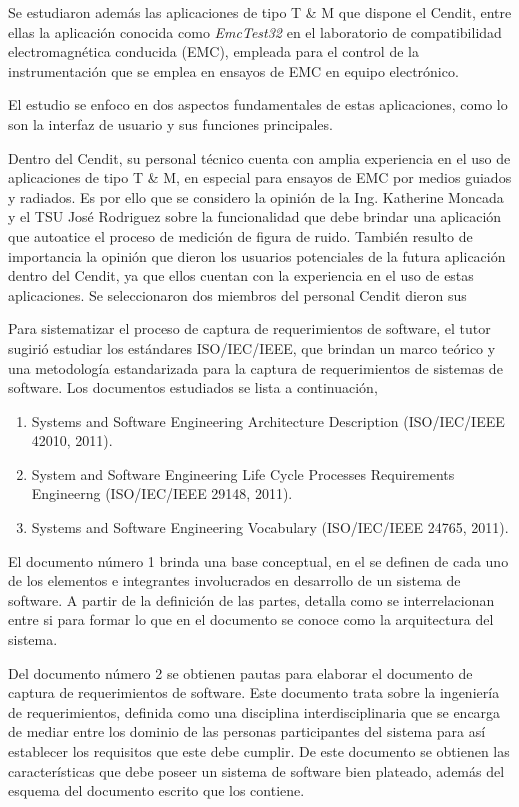 \documentclass[paper=letter,oneside,fontsize=12pt, parskip=full]{article}
\begin{document}
	Se estudiaron además las aplicaciones de tipo T \& M que dispone el Cendit, entre ellas la aplicación conocida como \emph{EmcTest32} en el laboratorio de compatibilidad electromagnética conducida (EMC), empleada para el control de la instrumentación que se emplea en ensayos de EMC en equipo electrónico.
	
	El estudio se enfoco en dos aspectos fundamentales de estas aplicaciones, como lo son la interfaz de usuario y sus funciones principales. 
	
	Dentro del Cendit, su personal técnico cuenta con amplia experiencia en el uso de aplicaciones de tipo T \& M, en especial para ensayos de EMC por medios guiados y radiados. Es por ello que se considero la opinión de la Ing. Katherine Moncada y el TSU José Rodriguez sobre la funcionalidad que debe brindar una aplicación que autoatice el proceso de medición de figura de ruido.  También resulto de importancia la opinión que dieron los usuarios potenciales de la futura aplicación dentro del Cendit, ya que ellos cuentan con la experiencia en el uso de estas aplicaciones. Se seleccionaron dos miembros del personal Cendit dieron sus 	
	
	Para sistematizar el proceso de captura de requerimientos de software, el tutor sugirió estudiar los estándares ISO/IEC/IEEE, que brindan un marco teórico y una metodología estandarizada para la captura de requerimientos de sistemas de software. Los documentos estudiados se lista a continuación,
	
	\begin{enumerate}  
		\item Systems and Software Engineering Architecture Description (ISO/IEC/IEEE 42010, 2011).		
		\item System and Software Engineering Life Cycle Processes Requirements Engineerng (ISO/IEC/IEEE 29148, 2011).
		\item Systems and Software Engineering Vocabulary (ISO/IEC/IEEE 24765, 2011).	
	\end{enumerate}
	
	El documento número 1 brinda una base conceptual, en el se definen de cada uno de los elementos e integrantes involucrados en desarrollo de un sistema de software. A partir de la definición de las partes, detalla como se interrelacionan entre si para formar lo que en el documento se conoce como la arquitectura del sistema. 
	
	Del documento número 2 se obtienen pautas para elaborar el documento de captura de requerimientos de software. Este documento trata sobre la ingeniería de requerimientos, definida como una disciplina interdisciplinaria que se encarga de mediar entre los dominio de las personas participantes del sistema para así establecer los requisitos que este debe cumplir. De este documento se obtienen las características que debe poseer un sistema de software bien plateado, además del esquema del documento escrito que los contiene.
	
\end{document}
